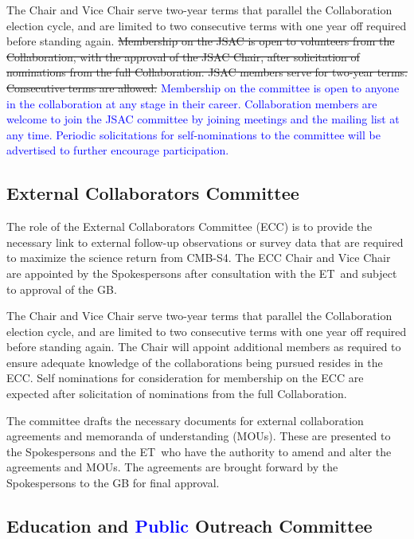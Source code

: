 \documentclass[12pt]{article}
\newcommand{\exec}{{Executive Team}}
\newcommand{\shorte}{{ET}}  %
\newcommand\collabname{CMB-S4}
\begin{document}
The Chair and Vice Chair serve two-year terms that parallel the Collaboration election cycle, and are limited to two consecutive terms with one year off required before standing again. \st{Membership on the JSAC is open to volunteers from the Collaboration, with the approval of the JSAC Chair, after solicitation of nominations from the full Collaboration. JSAC members serve for two-year terms. Consecutive terms are allowed.} \textcolor{blue}{Membership on the committee is open to anyone in the collaboration at any stage in their career. Collaboration members are welcome to join the JSAC committee by joining meetings and the mailing list at any time. Periodic solicitations for self-nominations to the committee will be advertised to further encourage participation.}


\subsection{External Collaborators Committee}

The role of the External Collaborators Committee (ECC) is to provide the necessary link to external follow-up observations or survey data that are required to maximize the science return from \collabname. The ECC Chair and Vice Chair are appointed by the Spokespersons after consultation with the \shorte\ and subject to approval of the GB.

The Chair and Vice Chair serve two-year terms that parallel the Collaboration election cycle, and are limited to two consecutive terms with one year off required before standing again. The Chair will appoint additional members as required to ensure adequate knowledge of the collaborations being pursued resides in the ECC. Self nominations for consideration for membership on the ECC are expected after solicitation of nominations from the full Collaboration.

The committee drafts the necessary documents for external collaboration agreements and memoranda of understanding (MOUs). These are presented to the Spokespersons and the \shorte\ who have the authority to amend and alter the agreements and MOUs. The agreements are brought forward by the Spokespersons to the GB for final approval.

\subsection{Education and \textcolor{blue}{Public} Outreach Committee}
\end{document}
